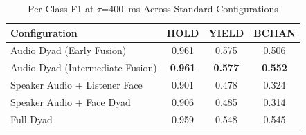 \begin{table}[h]
\caption{Per-Class F1 at $\tau$=400~ms Across Standard Configurations}
\label{tab:f1_per_class_standard}
\small
\renewcommand{\arraystretch}{1.20}
\begin{tabular}{>{\raggedright\arraybackslash}p{4cm}ccc}
\toprule
Configuration & HOLD & YIELD & BCHAN \\
\midrule
Audio Dyad (Early Fusion) & 0.961 & 0.575 & 0.506 \\
Audio Dyad (Intermediate Fusion) & \textbf{0.961} & \textbf{0.577} & \textbf{0.552} \\
Speaker Audio + Listener Face & 0.901 & 0.478 & 0.324 \\
Speaker Audio + Face Dyad & 0.906 & 0.485 & 0.314 \\
Full Dyad & 0.959 & 0.548 & 0.545 \\
\bottomrule
\end{tabular}
\end{table}
